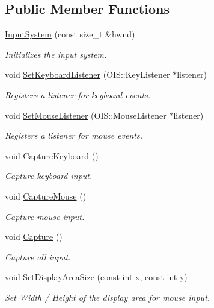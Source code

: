 \subsection*{Public Member Functions}
\begin{DoxyCompactItemize}
\item 
\hyperlink{class_input_system_a5ee8dc26e9427ae16adf86343cb37474}{Input\-System} (const size\-\_\-t \&hwnd)
\begin{DoxyCompactList}\small\item\em Initializes the input system. \end{DoxyCompactList}\item 
void \hyperlink{class_input_system_a3138ee4e685e64dc5e226f5b5975d143}{Set\-Keyboard\-Listener} (O\-I\-S\-::\-Key\-Listener $\ast$listener)
\begin{DoxyCompactList}\small\item\em Registers a listener for keyboard events. \end{DoxyCompactList}\item 
void \hyperlink{class_input_system_a823790cf8427fb7b5106ad12775897c3}{Set\-Mouse\-Listener} (O\-I\-S\-::\-Mouse\-Listener $\ast$listener)
\begin{DoxyCompactList}\small\item\em Registers a listener for mouse events. \end{DoxyCompactList}\item 
void \hyperlink{class_input_system_a207aa71ea26739f9f23b6e1ca46e48c9}{Capture\-Keyboard} ()
\begin{DoxyCompactList}\small\item\em Capture keyboard input. \end{DoxyCompactList}\item 
void \hyperlink{class_input_system_a4b7c5b2c426479b425926575340a6079}{Capture\-Mouse} ()
\begin{DoxyCompactList}\small\item\em Capture mouse input. \end{DoxyCompactList}\item 
void \hyperlink{class_input_system_a32edacdd7c8df35605c5771d422c2b50}{Capture} ()
\begin{DoxyCompactList}\small\item\em Capture all input. \end{DoxyCompactList}\item 
\hypertarget{class_input_system_a6361197c001fe46aa6e44cf0936487e1}{void \hyperlink{class_input_system_a6361197c001fe46aa6e44cf0936487e1}{Set\-Display\-Area\-Size} (const int x, const int y)}\label{class_input_system_a6361197c001fe46aa6e44cf0936487e1}

\begin{DoxyCompactList}\small\item\em Set Width / Height of the display area for mouse input. \end{DoxyCompactList}\end{DoxyCompactItemize}


